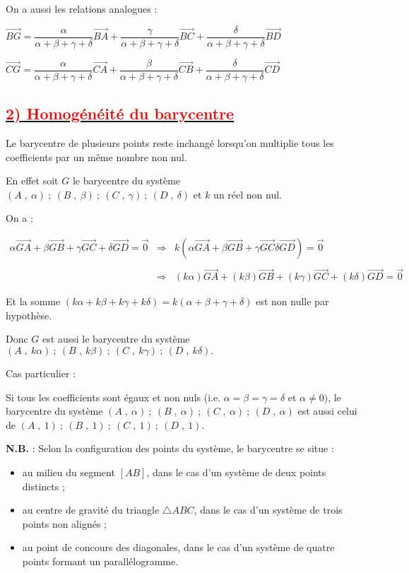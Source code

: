 \documentclass{article}
\begin{document}
	On a aussi les relations analogues :
	
		$\overrightarrow{BG}=\dfrac{\alpha}{\alpha+\beta+\gamma+\delta}\overrightarrow{BA}+\dfrac{\gamma}{\alpha+\beta+\gamma+\delta}\overrightarrow{BC}+\dfrac{\delta}{\alpha+\beta+\gamma+\delta}\overrightarrow{BD}$
		
		$\overrightarrow{CG}=\dfrac{\alpha}{\alpha+\beta+\gamma+\delta}\overrightarrow{CA}+\dfrac{\beta}{\alpha+\beta+\gamma+\delta}\overrightarrow{CB}+\dfrac{\delta}{\alpha+\beta+\gamma+\delta}\overrightarrow{CD}$
		
		\subsection*{\underline{\textbf{\textcolor{red}{2) Homogénéité du barycentre}}}}
		
		Le barycentre de plusieurs points reste inchangé lorsqu'on multiplie tous les coefficients par un même nombre non nul.
		
		En effet soit $G$ le barycentre du système ${(A\;,\ \alpha)\ ;\ (B\;,\ \beta)\ ;\ (C\;,\ \gamma)\ ;\ (D\;,\ \delta)}$ et $k$ un réel non nul. 

On a :

$\begin{array}{rcl} \alpha\overrightarrow{GA}+\beta\overrightarrow{GB}+\gamma\overrightarrow{GC}+\delta\overrightarrow{GD}=\vec{0}&\Rightarrow & k\left(\alpha\overrightarrow{GA}+\beta\overrightarrow{GB}+\gamma\overrightarrow{GC}\delta\overrightarrow{GD}\right)=\vec{0}\\\\&\Rightarrow & (k\alpha)\overrightarrow{GA}+(k\beta)\overrightarrow{GB}+(k\gamma)\overrightarrow{GC}+(k\delta)\overrightarrow{GD}=\vec{0}\end{array}$

Et la somme $(k\alpha+k\beta+k\gamma+k\delta)=k(\alpha+\beta+\gamma+\delta)$ est non nulle par hypothèse.

Donc $G$ est aussi le barycentre du système ${(A\;,\ k\alpha)\ ;\ (B\;,\ k\beta)\ ;\ (C\;,\ k\gamma)\ ;\ (D\;,\ k\delta)}.$

Cas particulier :

Si tous les coefficients sont égaux et non nuls (i.e. $\alpha=\beta=\gamma=\delta$ et $\alpha\neq 0)$, le barycentre du système ${(A\;,\ \alpha)\ ;\ (B\;,\ \alpha)\ ;\ (C\;,\ \alpha)\ ;\ (D\;,\ \alpha)}$ est aussi celui de ${(A\;,\ 1)\ ;\ (B\;,\ 1)\ ;\ (C\;,\ 1)\ ;\ (D\;,\ 1)}.$

\textbf{N.B.} : Selon la configuration des points du système, le barycentre se situe :
\begin{itemize}
    \item au milieu du segment \([AB]\), dans le cas d'un système de deux points distincts ;
    \item au centre de gravité du triangle \(\triangle ABC\), dans le cas d'un système de trois points non alignés ;
    \item au point de concours des diagonales, dans le cas d'un système de quatre points formant un parallélogramme.
\end{itemize}
\end{document}
